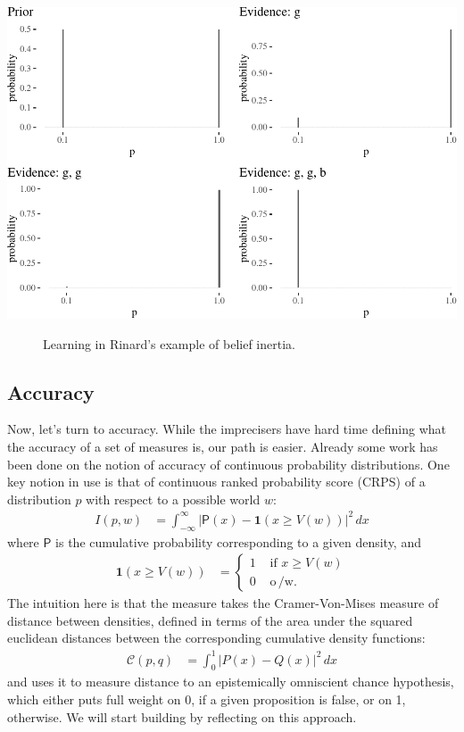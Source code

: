 \documentclass[
  10pt,
  dvipsnames,enabledeprecatedfontcommands]{scrartcl}
\begin{document}
\begin{center}\includegraphics[width=1\linewidth]{impreciseEpistemicFINAL_files/figure-latex/rinardCalculations-1} \end{center}

\begin{figure}[H]

\caption{Learning in Rinard's example of belief inertia.}
\label{fig:rinard2}
\end{figure}

\hypertarget{accuracy-1}{%
\subsection{Accuracy}\label{accuracy-1}}

Now, let's turn to accuracy. While the imprecisers have hard time
defining what the accuracy of a set of measures is, our path is easier.
Already some work has been done on the notion of accuracy of continuous
probability distributions. One key notion in use is that of continuous
ranked probability score (CRPS) of a distribution \(p\) with respect to
a possible world \(w\): \begin{align*}
I(p,w) &= \int_{-\infty}^\infty \vert \mathsf{P}(x) - \mathbf{ 1 }(x\geq V(w))\vert ^2 \, dx
\end{align*} \noindent where \(\mathsf{P}\) is the cumulative
probability corresponding to a given density, and \begin{align*}
\mathbf{ 1 }(x \geq V(w)) & = \begin{cases} 1 & \text{ if } x \geq V(w)\\
0 & \text{ o$\,$/w. }
\end{cases}
\end{align*} \noindent  The intuition here is that the measure takes the
Cramer-Von-Mises measure of distance between densities, defined in terms
of the area under the squared euclidean distances between the
corresponding cumulative density functions: \begin{align*}
\mathcal{C}(p,q) & = \int_{0}^{1} \vert P(x) - Q(x)\vert^2 \, dx
\end{align*} \noindent and uses it to measure distance to an
epistemically omniscient chance hypothesis, which either puts full
weight on 0, if a given proposition is false, or on 1, otherwise. We
will start building by reflecting on this approach.
\end{document}
